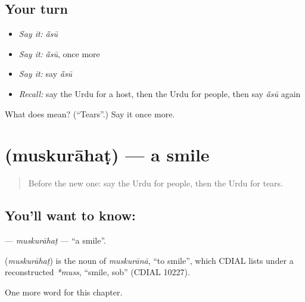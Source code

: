 \subsection*{Your turn}
\begin{itemize}
\raggedright
  \item \emph{Say it:} \emph{ā̃sū}
  \item \emph{Say it:} \emph{ā̃sū}, once more
  \item \emph{Say it:} say \emph{ā̃sū}
  \item \emph{Recall:} say the Urdu for a host, then the Urdu for people, then say \emph{ā̃sū} again
\end{itemize}

\begin{tcolorbox}[breakable,colback=teal!4,colframe=teal!35!black,title={Before you move on}]
What does  mean? (\textquotedblleft{}Tears\textquotedblright{}.) Say it once more.
\end{tcolorbox}
\section[\texorpdfstring{\ur{مسکراہٹ} (muskurāhaṭ)}{مسکراہٹ (muskurāhaṭ)}]{ (muskurāhaṭ) — a smile}

\label{lesson:UR-C257-muskurahat}



\begin{quote}
Before the new one: say the Urdu for people, then the Urdu for tears.
\end{quote}

\subsection*{You'll want to know: }
\textbf{} — \emph{muskurāhaṭ} — \textquotedblleft{}a smile\textquotedblright{}.

\begin{cousinweb}
\textbf{} (\emph{muskurāhaṭ}) is the noun of \emph{muskurānā}, \textquotedblleft{}to smile\textquotedblright{}, which CDIAL lists under a reconstructed \emph{*muss}, \textquotedblleft{}smile, sob\textquotedblright{} (CDIAL 10227).
\end{cousinweb}

\begin{grammarlens}[title={What you've built}]
One more word for this chapter.
\end{grammarlens}

